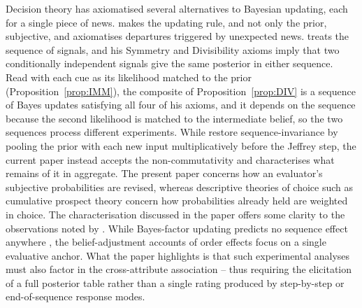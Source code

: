 \documentclass[a4paper,fleqn]{cas-sc}
\theoremstyle{remark}
\theoremstyle{definition}
\begin{document}
Decision theory has axiomatised several alternatives to Bayesian updating, each
for a single piece of news. \citet{Epstein2006} makes the updating rule, and not only
the prior, subjective, and \citet{Ortoleva2012} axiomatises departures triggered by
unexpected news. \citet{Cripps2021} treats the sequence of signals, and his
Symmetry and Divisibility axioms imply that two conditionally independent signals
give the same posterior in either sequence. Read with each cue as its likelihood matched to the prior
(Proposition~\ref{prop:IMM}), the composite of Proposition~\ref{prop:DIV} is a
sequence of Bayes updates satisfying all four of his axioms, and it depends on the
sequence because the second likelihood is matched to the intermediate belief, so
the two sequences process different experiments. While \citet{PettigrewWeisberg2025} restore sequence-invariance by pooling the
prior with each new input multiplicatively before the Jeffrey step, the current paper instead accepts the non-commutativity and characterises what remains of it in aggregate. The present paper concerns how an evaluator's subjective probabilities are revised, whereas descriptive theories of choice such as cumulative
prospect theory \citep{TverskyKahneman1992} concern how probabilities already held are weighted in
choice. The characterisation discussed in the paper offers some clarity to the observations noted by \citet{HogarthEinhorn1992}. While Bayes-factor updating predicts no sequence effect anywhere \citep{Wagner2002}, the belief-adjustment accounts of order effects \citep{HogarthEinhorn1992} focus on a single evaluative anchor. What the paper highlights is that such experimental analyses must also factor in the cross-attribute association -- thus requiring the elicitation of a full posterior table rather than a single rating produced by step-by-step or end-of-sequence response modes. 
\end{document}
